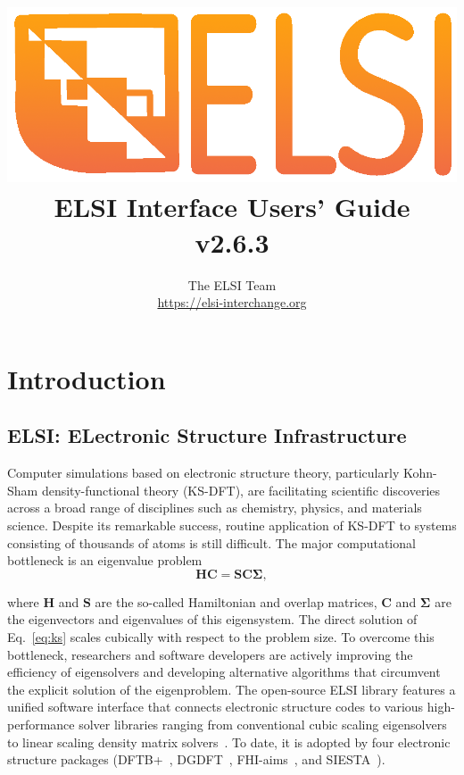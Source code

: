 \documentclass{report}
\begin{document}
\title{\includegraphics[scale=0.07]{elsi_logo.png}\\ \vspace{0.5cm} \textbf{ELSI Interface Users' Guide\\ v2.6.3}}
\author{The ELSI Team\\ \url{https://elsi-interchange.org}}
\maketitle

\tableofcontents

\chapter{Introduction}
\section{ELSI: ELectronic Structure Infrastructure}
\label{sec:elsi}
Computer simulations based on electronic structure theory, particularly Kohn-Sham density-functional theory (KS-DFT), are facilitating scientific discoveries across a broad range of disciplines such as chemistry, physics, and materials science. Despite its remarkable success, routine application of KS-DFT to systems consisting of thousands of atoms is still difficult. The major computational bottleneck is an eigenvalue problem
\begin{equation}
\label{eq:ks}
\boldsymbol{H} \boldsymbol{C} = \boldsymbol{S} \boldsymbol{C} \boldsymbol{\Sigma},
\end{equation}

where $\boldsymbol{H}$ and $\boldsymbol{S}$ are the so-called Hamiltonian and overlap matrices, $\boldsymbol{C}$ and $\boldsymbol{\Sigma}$ are the eigenvectors and eigenvalues of this eigensystem. The direct solution of Eq.~\ref{eq:ks} scales cubically with respect to the problem size. To overcome this bottleneck, researchers and software developers are actively improving the efficiency of eigensolvers and developing alternative algorithms that circumvent the explicit solution of the eigenproblem. The open-source ELSI library features a unified software interface that connects electronic structure codes to various high-performance solver libraries ranging from conventional cubic scaling eigensolvers to linear scaling density matrix solvers~\cite{elsi_yu_2018}. To date, it is adopted by four electronic structure packages (DFTB+~\cite{dftb_aradi_2007}, DGDFT~\cite{dgdft_hu_2015}, FHI-aims~\cite{fhiaims_blum_2009}, and SIESTA~\cite{siesta_soler_2002}).
\end{document}
